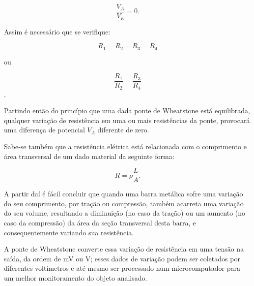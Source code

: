 \[
\frac{V_A}{V_E} = 0.
\]

Assim é necessário que se verifique:

\[ R_1 = R_2 = R_3 = R_4 \]

ou  

\[ \frac{R_1}{R_2} = \frac{R_3}{R_4} \].

Partindo então do princípio que uma dada ponte de Wheatstone está equilibrada, qualquer variação de resistência em uma ou mais resistências da ponte, provocará uma diferença de potencial $V_A$ diferente de zero. 

Sabe-se também que a resistência elétrica está relacionada com o comprimento e área transversal de um dado material da seguinte forma:

\[ 
    R = \rho \frac{L}{A}.
\]

A partir daí é fácil concluir que quando uma barra metálica sofre uma variação do seu comprimento, por tração ou compressão, também acarreta uma variação do seu volume, resultando a diminuição (no caso da tração) ou um aumento (no caso da compressão) da área da seção transversal desta barra, e consequentemente variando sua resistência. 

A ponte de Wheatstone converte essa variação de resistência em uma tensão na saída, da ordem de mV ou V; esses dados de variação podem ser coletados por diferentes voltímetros e até mesmo ser processado num microcomputador para um melhor monitoramento do objeto analisado.